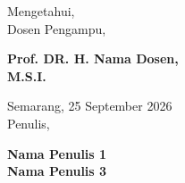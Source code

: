\vspace{1.5cm}

\noindent
\begin{minipage}[t]{0.45\textwidth}
    \centering
    Mengetahui,\\
    Dosen Pengampu,

    \vspace{2.5cm}

    \textbf{Prof. DR. H. Nama Dosen,}\\
    \textbf{M.S.I.}
\end{minipage}%
\hfill
\begin{minipage}[t]{0.45\textwidth}
    \centering
    Semarang, 25 September 2026\\
    Penulis,

    \vspace{2.5cm}

    \textbf{Nama Penulis 1}\\
    \textbf{Nama Penulis 3}
\end{minipage}

